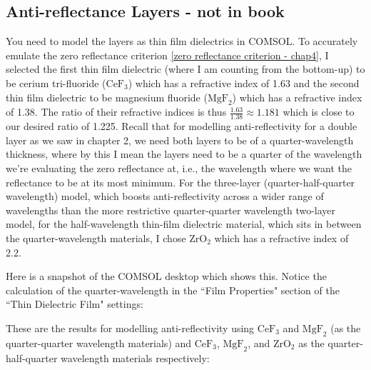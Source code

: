 
\subsection{Anti-reflectance Layers - not in book}

You need to model the layers as thin film dielectrics in COMSOL. To accurately emulate the zero reflectance criterion \ref{zero reflectance criterion - chap4}, I selected the first thin film dielectric (where I am counting from the bottom-up) to be cerium tri-fluoride ($\text{CeF}_3$) which has a refractive index of 1.63 and the second thin film dielectric to be magnesium fluoride ($\text{MgF}_2$) which has a refractive index of 1.38. The ratio of their refractive indices is thus $\frac{1.63}{1.38} \approx 1.181$ which is close to our desired ratio of 1.225. Recall that for modelling anti-reflectivity for a double layer as we saw in chapter 2, we need both layers to be of a quarter-wavelength thickness, where by this I mean the layers need to be a quarter of the wavelength we're evaluating the zero reflectance at, i.e., the wavelength where we want the reflectance to be at its most minimum. For the three-layer (quarter-half-quarter wavelength) model, which boosts anti-reflectivity across a wider range of wavelengths than the more restrictive quarter-quarter wavelength two-layer model, for the half-wavelength thin-film dielectric material, which sits in between the quarter-wavelength materials, I chose $\text{ZrO}_2$ which has a refractive index of 2.2.

Here is a snapshot of the COMSOL desktop which shows this. Notice the calculation of the quarter-wavelength in the ``Film Properties" section of the ``Thin Dielectric Film" settings:



These are the results for modelling anti-reflectivity using $\text{CeF}_3$ and $\text{MgF}_2$ (as the quarter-quarter wavelength materials) and $\text{CeF}_3$, $\text{MgF}_2$, and $\text{ZrO}_2$ as the quarter-half-quarter wavelength materials respectively:

